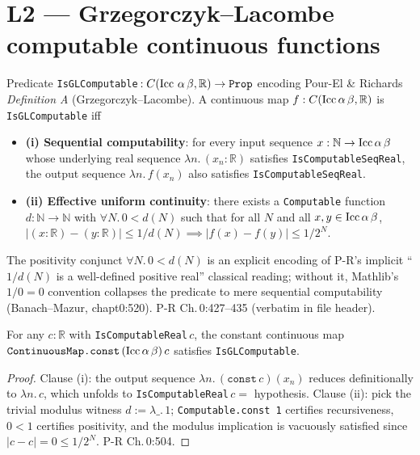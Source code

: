 \chapter{L2 — Grzegorczyk--Lacombe computable continuous functions}


\begin{definition}
  \label{def:l2_isGLComputable}
  \leanok
  Predicate \texttt{IsGLComputable}\,$: C(\textnormal{Icc } \alpha\, \beta, \mathbb{R}) \to \texttt{Prop}$ encoding Pour-El \& Richards \emph{Definition A} (Grzegorczyk--Lacombe). A continuous map $f : C(\textnormal{Icc}\,\alpha\,\beta, \mathbb{R})$ is \texttt{IsGLComputable} iff
  \begin{itemize}
    \item \textbf{(i) Sequential computability}: for every input sequence $x : \mathbb{N} \to \textnormal{Icc}\,\alpha\,\beta$ whose underlying real sequence $\lambda n.\,(x_n : \mathbb{R})$ satisfies \texttt{IsComputableSeqReal}, the output sequence $\lambda n.\,f(x_n)$ also satisfies \texttt{IsComputableSeqReal}.
    \item \textbf{(ii) Effective uniform continuity}: there exists a \texttt{Computable} function $d : \mathbb{N} \to \mathbb{N}$ with $\forall N.\,0 < d(N)$ such that for all $N$ and all $x, y \in \textnormal{Icc}\,\alpha\,\beta$, $|(x : \mathbb{R}) - (y : \mathbb{R})| \le 1/d(N) \implies |f(x) - f(y)| \le 1/2^N$.
  \end{itemize}
  The positivity conjunct $\forall N.\,0 < d(N)$ is an explicit encoding of P-R's implicit ``$1/d(N)$ is a well-defined positive real'' classical reading; without it, Mathlib's $1/0 = 0$ convention collapses the predicate to mere sequential computability (Banach--Mazur, chapt0:520). P-R Ch.\,0:427--435 (verbatim in file header).
\end{definition}

\begin{lemma}
  \label{lem:l2_const_gl}
  \leanok
  For any $c : \mathbb{R}$ with \texttt{IsComputableReal}\,$c$, the constant continuous map $\texttt{ContinuousMap.const}\,(\textnormal{Icc}\,\alpha\,\beta)\,c$ satisfies \texttt{IsGLComputable}.
\end{lemma}
\begin{proof}\leanok
  Clause (i): the output sequence $\lambda n.\,(\texttt{const}\,c)(x_n)$ reduces definitionally to $\lambda n.\,c$, which unfolds to \texttt{IsComputableReal}\,$c = $ hypothesis. Clause (ii): pick the trivial modulus witness $d := \lambda \_.\,1$; \texttt{Computable.const 1} certifies recursiveness, $0 < 1$ certifies positivity, and the modulus implication is vacuously satisfied since $|c - c| = 0 \le 1/2^N$. P-R Ch.\,0:504.
\end{proof}

